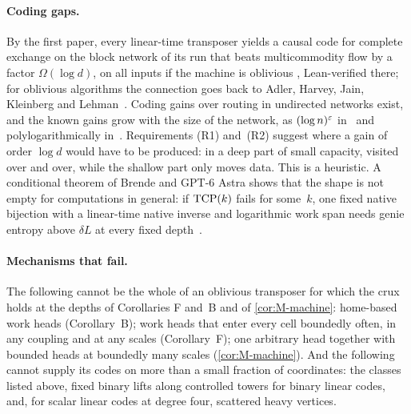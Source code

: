 \paragraph{Coding gaps.} By the first paper, every linear-time transposer yields a causal code for complete exchange on the
block network of its run that beats multicommodity flow by a factor $\Omega(\log d)$, on all inputs if the machine is oblivious
\cite[Theorems~8.8, 9.2 and~9.9]{FirstPaper2026}, Lean-verified there; for oblivious algorithms the connection goes back to
Adler, Harvey, Jain, Kleinberg and Lehman~\cite[Theorem~6.2]{AHJKL2006}. Coding gains over routing in undirected networks
exist, and the known gains grow with the size of the network, as $(\log n)^{\varepsilon}$ in~\cite{BravermanHe2026} and
polylogarithmically in~\cite{ZhangLiLi2026}.
Requirements (R1) and~(R2) suggest where a gain of order $\log d$ would have to be produced: in a deep part of small
capacity, visited over and over, while the shallow part only moves data. This is a heuristic. A conditional theorem of Brende and
GPT-6 Astra shows that the shape is not empty for computations in general: if $\mathrm{TCP}(k)$ fails for some~$k$, one fixed native
bijection with a linear-time native inverse and logarithmic work span needs genie entropy above $\delta L$ at every fixed
depth~\cite[Theorem~H]{InfoDepthMemo2026}.

\paragraph{Mechanisms that fail.} The following cannot be the whole of an oblivious transposer for which the crux holds at
the depths of Corollaries F and~B and of \cref{cor:M-machine}: home-based work heads
(Corollary~B); work heads that enter every cell boundedly often, in any coupling and at any scales (Corollary~F); one arbitrary
head together with bounded heads at boundedly many scales (\cref{cor:M-machine}). And the following cannot supply its codes on
more than a small fraction of coordinates: the classes listed above, fixed binary lifts along controlled towers for binary linear codes,
and, for scalar linear codes at degree four, scattered heavy vertices.
